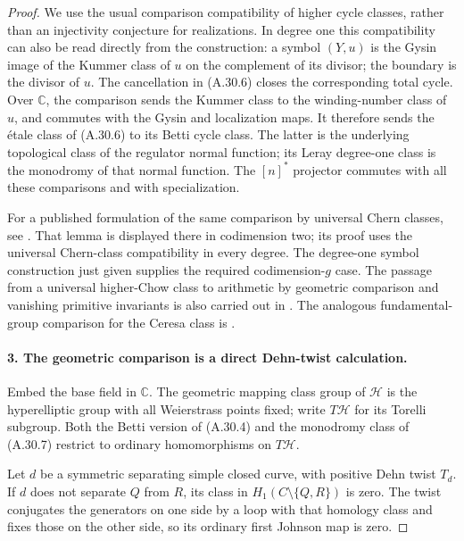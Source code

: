 \begin{proof}
We use the usual comparison compatibility of higher
cycle classes, rather than an injectivity conjecture
for realizations. In degree one this compatibility
can also be read directly from the construction:
a symbol $(Y,u)$ is the Gysin image of the Kummer
class of $u$ on the complement of its divisor;
the boundary is the divisor of $u$. The cancellation
in (A.30.6) closes the corresponding total cycle.
Over $\mathbb C$, the comparison sends the Kummer
class to the winding-number class of $u$, and
commutes with the Gysin and localization maps.
It therefore sends the \'etale class of (A.30.6)
to its Betti cycle class. The latter is the
underlying topological class of the regulator
normal function; its Leray degree-one class is
the monodromy of that normal function.
The $[n]^*$ projector commutes with all these
comparisons and with specialization.

For a published formulation of the same comparison
by universal Chern classes, see
\cite[Section 2, especially Lemma 2.2]{fghAsakuraSaito}.
That lemma is displayed there in codimension two;
its proof uses the universal Chern-class compatibility
in every degree. The degree-one symbol construction
just given supplies the required codimension-$g$
case. The passage from a universal higher-Chow
class to arithmetic by geometric comparison and
vanishing primitive invariants is also carried out
in \cite[Claim 3.3 and the following comparison on
pp.~171--172]{fghAsakuraSaito}. The analogous
fundamental-group comparison for the Ceresa class
is \cite[Corollary 6.7 and Theorem 8.1]{fghHainMatsumoto}.

\paragraph{3. The geometric comparison is a direct Dehn-twist calculation.}
Embed the base field in $\mathbb C$. The geometric
mapping class group of $\mathcal H$ is the
hyperelliptic group with all Weierstrass points
fixed; write $T\mathcal H$ for its Torelli subgroup.
Both the Betti version of (A.30.4) and the
monodromy class of (A.30.7) restrict to ordinary
homomorphisms on $T\mathcal H$.

Let $d$ be a symmetric separating simple closed
curve, with positive Dehn twist $T_d$. If $d$
does not separate $Q$ from $R$, its class in
$H_1(C\setminus\{Q,R\})$ is zero. The twist
conjugates the generators on one side by a
loop with that homology class and fixes those
on the other side, so its ordinary first
Johnson map is zero.


\end{proof}
